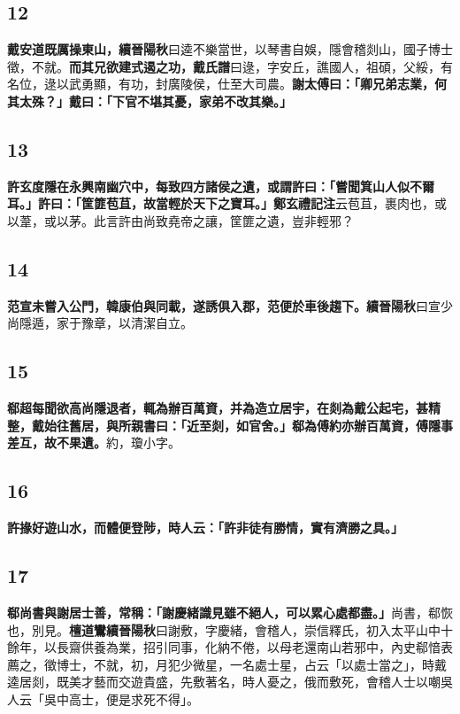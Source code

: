 \subsection*{12}

\textbf{戴安道既厲操東山，}{\footnotesize \textbf{續晉陽秋}曰逵不樂當世，以琴書自娛，隱會稽剡山，國子博士徵，不就。}\textbf{而其兄欲建式遏之功，}{\footnotesize \textbf{戴氏譜}曰逯，字安丘，譙國人，祖碩，父綏，有名位，逯以武勇顯，有功，封廣陵侯，仕至大司農。}\textbf{謝太傅曰：「卿兄弟志業，何其太殊？」戴曰：「下官不堪其憂，家弟不改其樂。」}

\subsection*{13}

\textbf{許玄度隱在永興南幽穴中，每致四方諸侯之遺，或謂許曰：「嘗聞箕山人似不爾耳。」許曰：「筐篚苞苴，故當輕於天下之寶耳。」}{\footnotesize \textbf{鄭玄禮記注}云苞苴，裹肉也，或以葦，或以茅。此言許由尚致堯帝之讓，筐篚之遺，豈非輕邪？}

\subsection*{14}

\textbf{范宣未嘗入公門，韓康伯與同載，遂誘俱入郡，范便於車後趨下。}{\footnotesize \textbf{續晉陽秋}曰宣少尚隱遁，家于豫章，以清潔自立。}

\subsection*{15}

\textbf{郗超每聞欲高尚隱退者，輒為辦百萬資，并為造立居宇，在剡為戴公起宅，甚精整，戴始往舊居，與所親書曰：「近至剡，如官舍。」郗為傅約亦辦百萬資，傅隱事差互，故不果遺。}{\footnotesize 約，瓊小字。}

\subsection*{16}

\textbf{許掾好遊山水，而體便登陟，時人云：「許非徒有勝情，實有濟勝之具。」}

\subsection*{17}

\textbf{郗尚書與謝居士善，常稱：「謝慶緒識見雖不絕人，可以累心處都盡。」}{\footnotesize 尚書，郗恢也，別見。\textbf{檀道鸞續晉陽秋}曰謝敷，字慶緒，會稽人，崇信釋氏，初入太平山中十餘年，以長齋供養為業，招引同事，化納不倦，以母老還南山若邪中，內史郗愔表薦之，徵博士，不就，初，月犯少微星，一名處士星，占云「以處士當之」，時戴逵居剡，既美才藝而交遊貴盛，先敷著名，時人憂之，俄而敷死，會稽人士以嘲吳人云「吳中高士，便是求死不得」。}